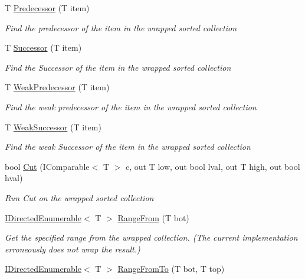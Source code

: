 \begin{DoxyCompactItemize}
T \hyperlink{class_c5_1_1_guarded_sorted_afd96c13a6d58d8db800b8ba78f843e29}{Predecessor} (T item)
\begin{DoxyCompactList}\small\item\em Find the predecessor of the item in the wrapped sorted collection \end{DoxyCompactList}\item 
T \hyperlink{class_c5_1_1_guarded_sorted_a042b2d69142f8957f0fec4958e67a99a}{Successor} (T item)
\begin{DoxyCompactList}\small\item\em Find the Successor of the item in the wrapped sorted collection \end{DoxyCompactList}\item 
T \hyperlink{class_c5_1_1_guarded_sorted_ae5fed4839e2e079fc0c07e141c7b51e3}{Weak\+Predecessor} (T item)
\begin{DoxyCompactList}\small\item\em Find the weak predecessor of the item in the wrapped sorted collection \end{DoxyCompactList}\item 
T \hyperlink{class_c5_1_1_guarded_sorted_a6a3aeb46c7bf83990651ce69a53f9fc6}{Weak\+Successor} (T item)
\begin{DoxyCompactList}\small\item\em Find the weak Successor of the item in the wrapped sorted collection \end{DoxyCompactList}\item 
bool \hyperlink{class_c5_1_1_guarded_sorted_a0372f6f2e220c389973eea8201390a27}{Cut} (I\+Comparable$<$ T $>$ c, out T low, out bool lval, out T high, out bool hval)
\begin{DoxyCompactList}\small\item\em Run Cut on the wrapped sorted collection \end{DoxyCompactList}\item 
\hyperlink{interface_c5_1_1_i_directed_enumerable}{I\+Directed\+Enumerable}$<$ T $>$ \hyperlink{class_c5_1_1_guarded_sorted_ac163fd0c999d9bd1581a2313c716b573}{Range\+From} (T bot)
\begin{DoxyCompactList}\small\item\em Get the specified range from the wrapped collection. (The current implementation erroneously does not wrap the result.) \end{DoxyCompactList}\item 
\hyperlink{interface_c5_1_1_i_directed_enumerable}{I\+Directed\+Enumerable}$<$ T $>$ \hyperlink{class_c5_1_1_guarded_sorted_a4654fa234e549063c0a820662e6b8e9e}{Range\+From\+To} (T bot, T top)

\end{DoxyCompactItemize}
